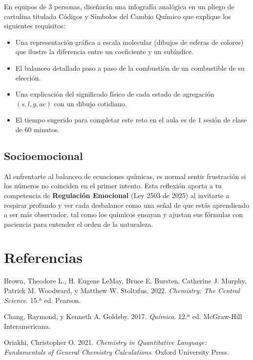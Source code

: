 \documentclass[
  spanish,
  letterpaper,
  12pt,
  oneside,
  open=any]{scrbook}
\newlength{\cslhangindent}
\newenvironment{CSLReferences}[2] %
 {\begin{list}{}{%
  \setlength{\itemindent}{0pt}
  \setlength{\leftmargin}{0pt}
  \setlength{\parsep}{0pt}
  \ifodd #1
   \setlength{\leftmargin}{\cslhangindent}
   \setlength{\itemindent}{-1\cslhangindent}
  \fi
  \setlength{\itemsep}{#2\baselineskip}}}
 {\end{list}}
\providecommand{\tightlist}{%
  \setlength{\itemsep}{0pt}\setlength{\parskip}{0pt}}
\newcommand{\setcolorsection}[2]{%
  \definecolor{currentsectionbg}{HTML}{#1}%
  \definecolor{currentsectionborder}{HTML}{#2}%
}
\begin{document}
En equipos de \(3\) personas, diseñarán una infografía analógica en un
pliego de cartulina titulada Códigos y Símbolos del Cambio Químico que
explique los siguientes requisitos:

\begin{itemize}
\tightlist
\item
  Una representación gráfica a escala molecular (dibujos de esferas de
  colores) que ilustre la diferencia entre un coeficiente y un
  subíndice.
\item
  El balanceo detallado paso a paso de la combustión de un combustible
  de su elección.
\item
  Una explicación del significado físico de cada estado de agregación
  \((s, l, g, ac)\) con un dibujo cotidiano.
\item
  El tiempo sugerido para completar este reto en el aula es de \(1\)
  sesión de clase de \(60\) minutos.
\end{itemize}

\setcolorsection{f4c8d8}{e0b0c4}

\section{Socioemocional}\label{socioemocional-1}

Al enfrentarte al balanceo de ecuaciones químicas, es normal sentir
frustración si los números no coinciden en el primer intento. Esta
reflexión aporta a tu competencia de \textbf{Regulación Emocional} (Ley
2503 de 2025) al invitarte a respirar profundo y ver cada desbalance
como una señal de que estás aprendiendo a ser más observador, tal como
los químicos ensayan y ajustan sus fórmulas con paciencia para entender
el orden de la naturaleza.

\cleardoublepage
{}
{}
\appendix

\chapter{Referencias}\label{referencias}

\protect{}\label{refs}
\begin{CSLReferences}{1}{1}
Brown, Theodore L., H. Eugene LeMay, Bruce E. Bursten, Catherine J.
Murphy, Patrick M. Woodward, y Matthew W. Stoltzfus. 2022.
\emph{Chemistry: The Central Science}. 15.ª ed. Pearson.

Chang, Raymond, y Kenneth A. Goldsby. 2017. \emph{Química}. 12.ª ed.
McGraw-Hill Interamericana.

Oriakhi, Christopher O. 2021. \emph{Chemistry in Quantitative Language:
Fundamentals of General Chemistry Calculations}. Oxford University
Press.

\end{CSLReferences}


\backmatter
\end{document}
